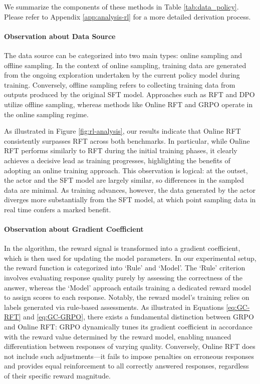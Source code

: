 \begin{itemize}[topsep=0pt]
\begin{itemize}[topsep=0pt]
We summarize the components of these methods in Table \ref{tab:data_policy}.
Please refer to Appendix \ref{app:analysis-rl} for a more detailed derivation process.

\paragraph{Observation about Data Source} The data source can be categorized into two main types: online sampling and offline sampling. In the context of online sampling, training data are generated from the ongoing exploration undertaken by the current policy model during training. Conversely, offline sampling refers to collecting training data from outputs produced by the original SFT model. Approaches such as RFT and DPO utilize offline sampling, whereas methods like Online RFT and GRPO operate in the online sampling regime.

As illustrated in Figure \ref{fig:rl-analysis}, our results indicate that Online RFT consistently surpasses RFT across both benchmarks. In particular, while Online RFT performs similarly to RFT during the initial training phases, it clearly achieves a decisive lead as training progresses, highlighting the benefits of adopting an online training approach. This observation is logical: at the outset, the actor and the SFT model are largely similar, so differences in the sampled data are minimal. As training advances, however, the data generated by the actor diverges more substantially from the SFT model, at which point sampling data in real time confers a marked benefit.

\paragraph{Observation about Gradient Coefficient} In the algorithm, the reward signal is transformed into a gradient coefficient, which is then used for updating the model parameters. In our experimental setup, the reward function is categorized into `Rule' and `Model'. The `Rule' criterion involves evaluating response quality purely by assessing the correctness of the answer, whereas the `Model' approach entails training a dedicated reward model to assign scores to each response. Notably, the reward model's training relies on labels generated via rule-based assessments. As illustrated in Equations \ref{eq:GC-RFT} and \ref{eq:GC-GRPO}, there exists a fundamental distinction between GRPO and Online RFT: GRPO dynamically tunes its gradient coefficient in accordance with the reward value determined by the reward model, enabling nuanced differentiation between responses of varying quality. Conversely, Online RFT does not include such adjustments—it fails to impose penalties on erroneous responses and provides equal reinforcement to all correctly answered responses, regardless of their specific reward magnitude.


\end{itemize}
\end{itemize}
